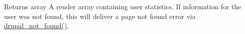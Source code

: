 \begin{DoxyReturn}{Returns}
array A render array containing user statistics. If information for the user was not found, this will deliver a page not found error via \hyperlink{group__http__handling_ga52b08cd98e1756326c1bd5b56c39a884}{drupal\_\-not\_\-found()}. 
\end{DoxyReturn}
